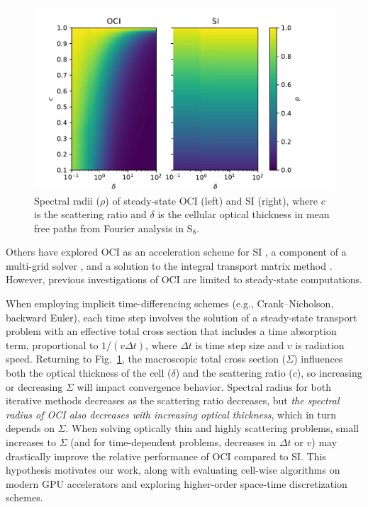 \begin{figure}
    \centering
    \includegraphics[width=\textwidth]{figures/therefore_figs/ss_specrads.pdf}
    \caption{Spectral radii (${\rho}$) of steady-state OCI (left) and SI (right), where $c$ is the scattering ratio and ${\delta}$ is the cellular optical thickness in mean free paths from Fourier analysis in S$_8$.}
    \label{fig:ss-sepcrad}
\end{figure}

Others have explored OCI as an acceleration scheme for SI \cite{ hoagland_hybrid_2021}, a component of a multi-grid solver \cite{man1995multigrid1, man1996multigrid2}, and a solution to the integral transport matrix method \cite{raffi2108pidotscom}.
However, previous investigations of OCI are limited to steady-state computations.

When employing implicit time-differencing schemes (e.g., Crank--Nicholson, backward Euler), each time step involves the solution of a steady-state transport problem with an effective total cross section that includes a time absorption term, proportional to $1/(v \Delta t)$, where $\Delta t$ is time step size and $v$ is radiation speed.
Returning to Fig.~\ref{fig:ss-sepcrad}, the macroscopic total cross section ($\Sigma$) influences both the optical thickness of the cell ($\delta$) and the scattering ratio ($c$), so increasing or decreasing $\Sigma$ will impact convergence behavior.
Spectral radius for both iterative methods decreases as the scattering ratio decreases, but \textit{the spectral radius of OCI also decreases with increasing optical thickness}, which in turn depends on $\Sigma$.
When solving optically thin and highly scattering problems, small increases to $\Sigma$ (and for time-dependent problems, decreases in $\Delta t$ or $v$) may drastically improve the relative performance of OCI compared to SI.
This hypothesis motivates our work, along with evaluating cell-wise algorithms on modern GPU accelerators and exploring higher-order space-time discretization schemes.


